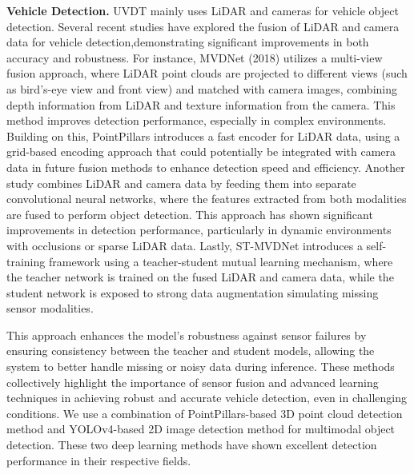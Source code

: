 \documentclass[lettersize,journal]{IEEEtran}
\begin{document}
\textbf{Vehicle Detection.}
UVDT mainly uses LiDAR and cameras for vehicle object detection.
Several recent studies have explored the fusion of LiDAR and camera data for vehicle detection,demonstrating significant improvements in both accuracy and robustness. 
For instance, MVDNet (2018) utilizes a multi-view fusion approach, where LiDAR point clouds are projected to different views (such as bird’s-eye view and front view) and matched with camera images, combining depth information from LiDAR and texture information from the camera. 
This method improves detection performance, especially in complex environments\cite{Alpher22h}. 
Building on this, PointPillars introduces a fast encoder for LiDAR data, using a grid-based encoding approach that could potentially be integrated with camera data in future fusion methods to enhance detection speed and efficiency\cite{Alpher19}.
Another study combines LiDAR and camera data by feeding them into separate convolutional neural networks, where the features extracted from both modalities are fused to perform object detection\cite{Alpher20e}. 
This approach has shown significant improvements in detection performance, particularly in dynamic environments with occlusions or sparse LiDAR data.
Lastly, ST-MVDNet introduces a self-training framework using a teacher-student mutual learning mechanism, where the teacher network is trained on the fused LiDAR and camera data, while the student network is exposed to strong data augmentation simulating missing sensor modalities\cite{Alpher22f}. 

This approach enhances the model’s robustness against sensor failures by ensuring consistency between the teacher and student models, allowing the system to better handle missing or noisy data during inference.
These methods collectively highlight the importance of sensor fusion and advanced learning techniques in achieving robust and accurate vehicle detection, even in challenging conditions.
We use a combination of PointPillars-based 3D point cloud detection method and YOLOv4-based 2D image detection method for multimodal object detection.
These two deep learning methods have shown excellent detection performance in their respective fields.
\end{document}
